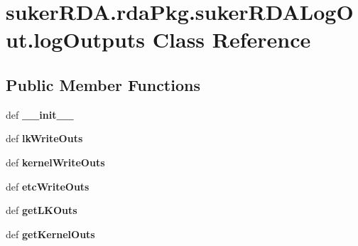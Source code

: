 \hypertarget{classsuker_r_d_a_1_1rda_pkg_1_1suker_r_d_a_log_out_1_1log_outputs}{\section{suker\+R\+D\+A.\+rda\+Pkg.\+suker\+R\+D\+A\+Log\+Out.\+log\+Outputs Class Reference}
\label{classsuker_r_d_a_1_1rda_pkg_1_1suker_r_d_a_log_out_1_1log_outputs}
}
\subsection*{Public Member Functions}
\begin{DoxyCompactItemize}
\item 
\hypertarget{classsuker_r_d_a_1_1rda_pkg_1_1suker_r_d_a_log_out_1_1log_outputs_a4ac0f6ac65e8c375169666b884d35011}{def {\bfseries \+\_\+\+\_\+init\+\_\+\+\_\+}}\label{classsuker_r_d_a_1_1rda_pkg_1_1suker_r_d_a_log_out_1_1log_outputs_a4ac0f6ac65e8c375169666b884d35011}

\item 
\hypertarget{classsuker_r_d_a_1_1rda_pkg_1_1suker_r_d_a_log_out_1_1log_outputs_a8cab869939222e567a521d54ebf73876}{def {\bfseries lk\+Write\+Outs}}\label{classsuker_r_d_a_1_1rda_pkg_1_1suker_r_d_a_log_out_1_1log_outputs_a8cab869939222e567a521d54ebf73876}

\item 
\hypertarget{classsuker_r_d_a_1_1rda_pkg_1_1suker_r_d_a_log_out_1_1log_outputs_ae3bb69a6f5987f65f6fde057fc440be9}{def {\bfseries kernel\+Write\+Outs}}\label{classsuker_r_d_a_1_1rda_pkg_1_1suker_r_d_a_log_out_1_1log_outputs_ae3bb69a6f5987f65f6fde057fc440be9}

\item 
\hypertarget{classsuker_r_d_a_1_1rda_pkg_1_1suker_r_d_a_log_out_1_1log_outputs_a18f5192325b6db0d383fbe03291b00fe}{def {\bfseries etc\+Write\+Outs}}\label{classsuker_r_d_a_1_1rda_pkg_1_1suker_r_d_a_log_out_1_1log_outputs_a18f5192325b6db0d383fbe03291b00fe}

\item 
\hypertarget{classsuker_r_d_a_1_1rda_pkg_1_1suker_r_d_a_log_out_1_1log_outputs_a43fd092a3322c49e7d0c988cfc6c1121}{def {\bfseries get\+L\+K\+Outs}}\label{classsuker_r_d_a_1_1rda_pkg_1_1suker_r_d_a_log_out_1_1log_outputs_a43fd092a3322c49e7d0c988cfc6c1121}

\item 
\hypertarget{classsuker_r_d_a_1_1rda_pkg_1_1suker_r_d_a_log_out_1_1log_outputs_a04eb793b5fa2732357b64805f4e67654}{def {\bfseries get\+Kernel\+Outs}}\label{classsuker_r_d_a_1_1rda_pkg_1_1suker_r_d_a_log_out_1_1log_outputs_a04eb793b5fa2732357b64805f4e67654}


\end{DoxyCompactItemize}
